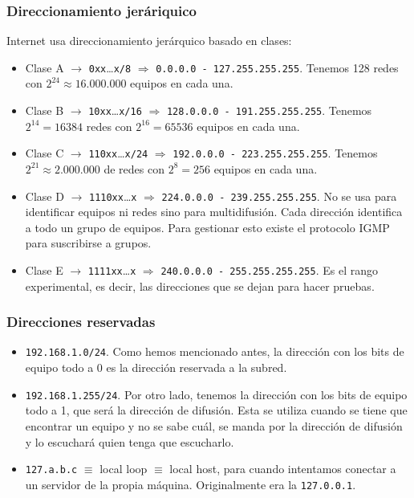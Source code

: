 \subsubsection{Direccionamiento jeráriquico}
\noindent
Internet usa direccionamiento jerárquico basado en clases:
\begin{itemize}
    \item Clase A $\rightarrow$ \verb|0xx|\ldots\verb|x/8| $\Longrightarrow $ \verb|0.0.0.0 - 127.255.255.255|. Tenemos 128 redes con $2^{24} \approx 16.000.000$ equipos en cada una. 
    \item Clase B $\rightarrow$ \verb|10xx|\ldots\verb|x/16| $\Longrightarrow $ \verb|128.0.0.0 - 191.255.255.255|. Tenemos $2^{14} = 16384$ redes con $2^{16}=65536$ equipos en cada una. 
    \item Clase C $\rightarrow$ \verb|110xx|\ldots\verb|x/24| $\Longrightarrow $ \verb|192.0.0.0 - 223.255.255.255|. Tenemos $2^{21} \approx 2.000.000$ de redes con $2^{8} = 256$ equipos en cada una. 
    \item Clase D $\rightarrow$ \verb|1110xx|\ldots\verb|x| $\Longrightarrow$ \verb|224.0.0.0 - 239.255.255.255|. No se usa para identificar equipos ni redes sino para multidifusión. Cada dirección identifica a todo un grupo de equipos. Para gestionar esto existe el protocolo \acrshort{IGMP} para suscribirse a grupos. 
    \item Clase E $\rightarrow$ \verb|1111xx|\ldots\verb|x| $\Longrightarrow $ \verb|240.0.0.0 - 255.255.255.255|. Es el rango experimental, es decir, las direcciones que se dejan para hacer pruebas. 
\end{itemize}

\subsubsection{Direcciones reservadas}
\begin{itemize}
    \item \verb|192.168.1.0/24|. Como hemos mencionado antes, la dirección con los bits de equipo todo a 0 es la dirección reservada a la subred. 
    \item \verb|192.168.1.255/24|. Por otro lado, tenemos la dirección con los bits de equipo todo a 1, que será la dirección de difusión. Esta se utiliza cuando se tiene que encontrar un equipo y no se sabe cuál, se manda por la dirección de difusión y lo escuchará quien tenga que escucharlo. 
    \item \verb|127.a.b.c| $\equiv$ local loop $\equiv$ local host, para cuando intentamos conectar a un servidor de la propia máquina. Originalmente era la \verb|127.0.0.1|.
\end{itemize}

